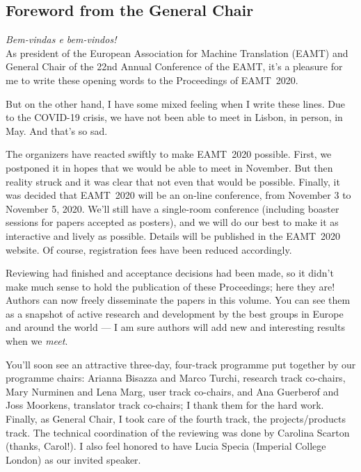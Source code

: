 \documentclass[a4paper,11pt,twoside]{book}
\newcommand{\newoddpage} {\clearpage
  \ifthenelse{\isodd{\value{page}}}{}
  {\thispagestyle{empty}\quad\newpage}}
\begin{document}
\vfill \mbox{}


\newoddpage
\frontmatter

\tableofcontents

\begin{onehalfspacing}

\chapter*{Foreword from the General Chair}


\noindent
\emph{Bem-vindas e bem-vindos!}\\

As president of the European Association for Machine Translation (EAMT) and General Chair of the 22nd Annual Conference of the EAMT, it's a pleasure for me to write these opening words to the Proceedings of EAMT~2020.

But on the other hand, I have some mixed feeling when I write these lines. Due to the COVID-19 crisis, we have not been able to meet in Lisbon, in person, in May. And that's so sad.

The organizers have reacted swiftly to make EAMT~2020 possible. First, we postponed it in hopes that we would be able to meet in November. But then reality struck and it was clear that not even that would be possible. Finally, it was decided that EAMT~2020 will be an on-line conference, from November 3 to November 5, 2020. We'll still have a single-room conference  (including boaster sessions for papers accepted as posters), and we will do our best to make it as interactive and lively as possible. Details will be published in the EAMT~2020 website. Of course, registration fees have been reduced accordingly.

Reviewing had finished and acceptance decisions had been made, so it didn't make much sense to hold the publication of these Proceedings; here they are! Authors can now freely disseminate the papers in this volume. You can see them as a snapshot of active research and development by the best groups in Europe and around the world --- I am sure authors will add new and interesting results when we \emph{meet}.

You'll soon see an attractive three-day, four-track programme put together by our programme chairs: Arianna Bisazza and Marco Turchi, research track co-chairs, Mary Nurminen and Lena Marg, user track co-chairs, and Ana Guerberof and Joss Moorkens, translator track co-chairs; I thank them for the hard work. Finally, as General Chair, I took care of the fourth track, the projects/products track. The technical coordination of the reviewing was done by Carolina Scarton (thanks, Carol!).  I also feel honored to have Lucia Specia (Imperial College London) as our invited speaker.


\end{onehalfspacing}
\end{document}
